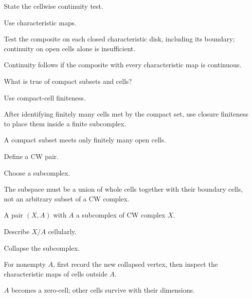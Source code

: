 \begin{exercise}\label{exr:viii06-19}
State the cellwise continuity test.
\end{exercise}
\begin{hint}
Use characteristic maps.

Test the composite on each closed characteristic disk, including its boundary; continuity on open cells alone is insufficient.
\end{hint}
\begin{solution}
Continuity follows if the composite with every characteristic map is continuous.
\end{solution}

\begin{exercise}\label{exr:viii06-20}
What is true of compact subsets and cells?
\end{exercise}
\begin{hint}
Use compact-cell finiteness.

After identifying finitely many cells met by the compact set, use closure finiteness to place them inside a finite subcomplex.
\end{hint}
\begin{solution}
A compact subset meets only finitely many open cells.
\end{solution}

\begin{exercise}\label{exr:viii06-21}
Define a CW pair.
\end{exercise}
\begin{hint}
Choose a subcomplex.

The subspace must be a union of whole cells together with their boundary cells, not an arbitrary subset of a CW complex.
\end{hint}
\begin{solution}
A pair \((X,A)\) with \(A\) a subcomplex of CW complex \(X\).
\end{solution}

\begin{exercise}\label{exr:viii06-22}
Describe \(X/A\) cellularly.
\end{exercise}
\begin{hint}
Collapse the subcomplex.

For nonempty \(A\), first record the new collapsed vertex, then inspect the characteristic maps of cells outside \(A\).
\end{hint}
\begin{solution}
\(A\) becomes a zero-cell; other cells survive with their dimensions.
\end{solution}


